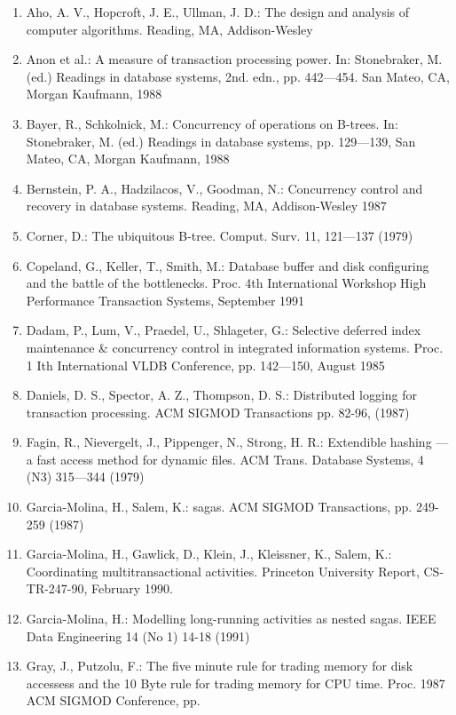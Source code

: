 \documentclass[a4paper,11pt,notitlepage,twoside,openright]{article}
\begin{document}
\begin{enumerate}
\def\labelenumi{\arabic{enumi}.}
\item
  Aho, A. V., Hopcroft, J. E., Ullman, J. D.: The design and analysis of
  computer algorithms. Reading, MA, Addison-Wesley
\item
  Anon et al.: A measure of transaction processing power. In:
  Stonebraker, M. (ed.) Readings in database systems, 2nd. edn., pp.
  442---454. San Mateo, CA, Morgan Kaufmann, 1988
\item
  Bayer, R., Schkolnick, M.: Concurrency of operations on B-trees. In:
  Stonebraker, M. (ed.) Readings in database systems, pp. 129---139, San
  Mateo, CA, Morgan Kaufmann, 1988
\item
  Bernstein, P. A., Hadzilacos, V., Goodman, N.: Concurrency control and
  recovery in database systems. Reading, MA, Addison-Wesley 1987
\item
  Corner, D.: The ubiquitous B-tree. Comput. Surv. 11, 121---137 (1979)
\item
  Copeland, G., Keller, T., Smith, M.: Database buffer and disk
  configuring and the battle of the bottlenecks. Proc. 4th International
  Workshop High Performance Transaction Systems, September 1991
\item
  Dadam, P., Lum, V., Praedel, U., Shlageter, G.: Selective deferred
  index maintenance \& concurrency control in integrated information
  systems. Proc. 1 Ith International VLDB Conference, pp. 142---150,
  August 1985
\item
  Daniels, D. S., Spector, A. Z., Thompson, D. S.: Distributed logging
  for transaction processing. ACM SIGMOD Transactions pp. 82-96, (1987)
\item
  Fagin, R., Nievergelt, J., Pippenger, N., Strong, H. R.: Extendible
  hashing --- a fast access method for dynamic files. ACM Trans.
  Database Systems, 4 (N3) 315---344 (1979)
\item
  Garcia-Molina, H., Salem, K.: sagas. ACM SIGMOD Transactions, pp.
  249-259 (1987)
\item
  Garcia-Molina, H., Gawlick, D., Klein, J., Kleissner, K., Salem, K.:
  Coordinating multitransactional activities. Princeton University
  Report, CS-TR-247-90, February 1990.
\item
  Garcia-Molina, H.: Modelling long-running activities as nested sagas.
  IEEE Data Engineering 14 (No 1) 14-18 (1991)
\item
  Gray, J., Putzolu, F.: The five minute rule for trading memory for
  disk accessess and the 10 Byte rule for trading memory for CPU time.
  Proc. 1987 ACM SIGMOD Conference, pp.
\end{enumerate}
\end{document}
